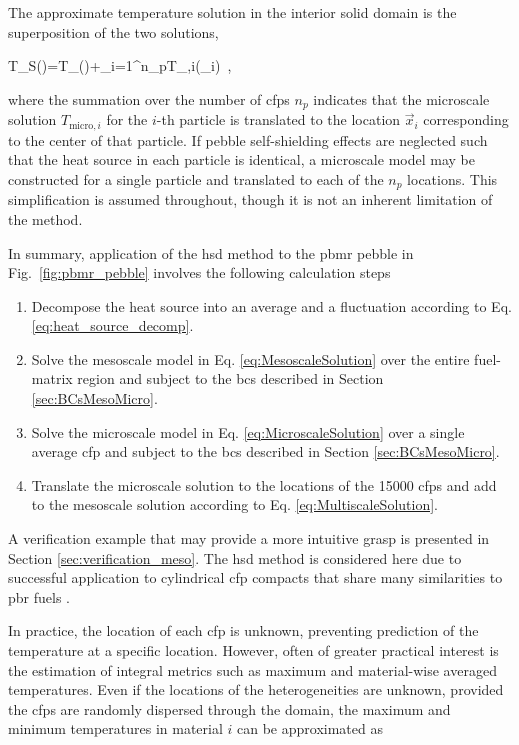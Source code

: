 The approximate temperature solution in the interior solid domain is the superposition of the two solutions,

\beq
\label{eq:MultiscaleSolution}
T_S()=T_()+\sum_{i=1}^{n_p}T_{,i}(_i)\ ,
\eeq

\noindent where the summation over the number of \glspl{cfp} \(n_p\) indicates that the microscale solution \(T_{\text{micro},i}\) for the \(i\)-th particle is translated to the location \(\vec{x}_i\) corresponding to the center of that particle. If pebble self-shielding effects are neglected such that the heat source in each particle is identical, a microscale model may be constructed for a single particle and translated to each of the \(n_p\) locations. This simplification is assumed throughout, though it is not an inherent limitation of the method. 

In summary, application of the \gls{hsd} method to the \gls{pbmr} pebble in Fig.\ \ref{fig:pbmr_pebble} involves the following calculation steps\mdash 

\begin{enumerate}
\itemsep0.3em
\item Decompose the heat source into an average and a fluctuation according to Eq. \eqref{eq:heat_source_decomp}.
\item Solve the mesoscale model in Eq. \eqref{eq:MesoscaleSolution} over the entire fuel-matrix region and subject to the \glspl{bc} described in Section \ref{sec:BCsMesoMicro}.
\item Solve the microscale model in Eq. \eqref{eq:MicroscaleSolution} over a single average \gls{cfp} and subject to the \glspl{bc} described in Section \ref{sec:BCsMesoMicro}.
\item Translate the microscale solution to the locations of the 15000 \glspl{cfp} and add to the mesoscale solution according to Eq. \eqref{eq:MultiscaleSolution}.
\end{enumerate}

A verification example that may provide a more intuitive grasp is presented in Section \ref{sec:verification_meso}. The \gls{hsd} method is considered here due to successful application to cylindrical \gls{cfp} compacts that share many similarities to \gls{pbr} fuels \cite{stainsby}.

In practice, the location of each \gls{cfp} is unknown, preventing prediction of the temperature at a specific location. However, often of greater practical interest is the estimation of integral metrics such as maximum and material-wise averaged temperatures. Even if the locations of the heterogeneities are unknown, provided the \glspl{cfp} are randomly dispersed through the domain, the maximum and minimum temperatures in material \(i\) can be approximated as

